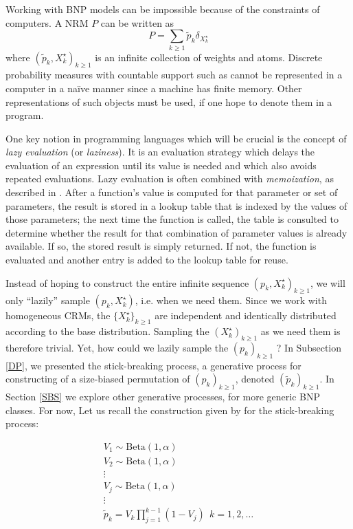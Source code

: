 Working with \gls{BNP} models can be impossible because of the constraints of computers.
A \gls{NRM} $P$ can be written \cite{Kingman:1967kn} as
$$P = \sum_{k \ge 1}{\tilde{p}_k \delta_{X^\star_k}} $$
where $\left(\tilde{p}_k, X^\star_k \right)_{k \ge 1}$ is an infinite collection of weights and atoms.
Discrete probability measures with countable support such as  cannot be represented in a computer in a naïve manner since a machine has finite memory.
Other representations of such objects must be used, if one hope to denote them in a program.

One key notion in programming languages which will be crucial is the concept of \textit{lazy evaluation} (or \textit{laziness}). It is an evaluation strategy which delays the evaluation of an expression until its value is needed and which also avoids repeated evaluations.
Lazy evaluation is often combined with \textit{memoization}, as described in \cite{Bentley:1982:WEP:539147}. After a function's value is computed for that parameter or set of parameters, the result is stored in a lookup table that is indexed by the values of those parameters; the next time the function is called, the table is consulted to determine whether the result for that combination of parameter values is already available. If so, the stored result is simply returned. If not, the function is evaluated and another entry is added to the lookup table for reuse.

Instead of hoping to construct the entire infinite sequence $\left({p}_k, X^\star_k \right)_{k \ge 1}$, we will only ``lazily'' sample $\left({p}_k, X^\star_k \right)$, i.e. when we need them.
Since we work with homogeneous \glspl{CRM}, the $\{X^\star_k\}_{k \ge 1}$ are independent and identically distributed according to the base distribution. Sampling the $(X^\star_k)_{k \ge 1}$ as we need them is therefore trivial. Yet, how could we lazily sample the $({p}_k)_{k \ge 1}$ ?
In Subsection \ref{DP}, we presented the stick-breaking process, a generative process for constructing of a size-biased permutation of $({p}_k)_{k \ge 1}$, denoted $(\tilde{p}_k)_{k \ge 1}$.
In Section \ref{SBS} we explore other generative processes, for more generic \gls{BNP} classes. For now, Let us recall the construction given by \cite{sethuraman94} for the stick-breaking process:


\begin{gather*}
V_1 \sim \text{Beta}(1, \alpha) \\
V_2 \sim \text{Beta}(1, \alpha) \\
\vdots \\
V_j \sim \text{Beta}(1, \alpha) \\
\vdots \\
\tilde{p}_k = V_k \prod_{j=1}^{k-1}(1-V_j) \ \ k= 1,2,\dots
\end{gather*}

